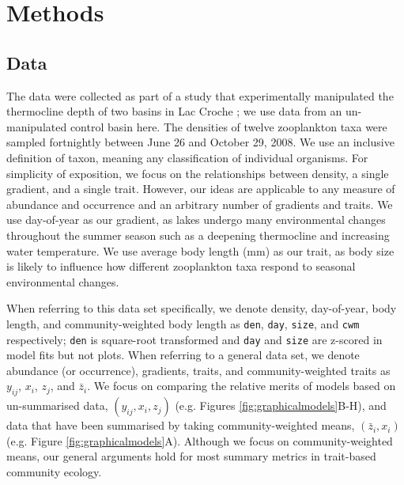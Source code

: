 \documentclass[12pt]{ecology}
\begin{document}

\section{Methods}

\subsection{Data}

The data were collected as part of a study that experimentally manipulated the thermocline depth of two basins in Lac Croche \citep{CantinEtAl2011}; we use data from an un-manipulated control basin here.  The densities of twelve zooplankton taxa were sampled fortnightly between June 26 and October 29, 2008.  We use an inclusive definition of taxon, meaning any classification of individual organisms.  For simplicity of exposition, we focus on the relationships between density, a single gradient, and a single trait.  However, our ideas are applicable to any measure of abundance and occurrence and an arbitrary number of gradients and traits.  We use day-of-year as our gradient, as lakes undergo many environmental changes throughout the summer season such as a deepening thermocline and increasing water temperature.  We use average body length (mm) as our trait, as body size is likely to influence how different zooplankton taxa respond to seasonal environmental changes.   %

When referring to this data set specifically, we denote density, day-of-year, body length, and community-weighted body length as \texttt{den}, \texttt{day}, \texttt{size}, and \texttt{cwm} respectively; \texttt{den} is square-root transformed and \texttt{day} and \texttt{size} are z-scored in model fits but not plots.  When referring to a general data set, we denote abundance (or occurrence), gradients, traits, and community-weighted traits as $y_{ij}$, $x_i$, $z_j$, and $\bar{z}_i$.  We focus on comparing the relative merits of models based on un-summarised data, $(y_{ij}, x_i, z_j)$ (e.g. Figures \ref{fig:graphicalmodels}B-H), and data that have been summarised by taking community-weighted means, $(\bar{z}_i, x_i)$ (e.g. Figure \ref{fig:graphicalmodels}A).  Although we focus on community-weighted means, our general arguments hold for most summary metrics in trait-based community ecology.
\end{document}
